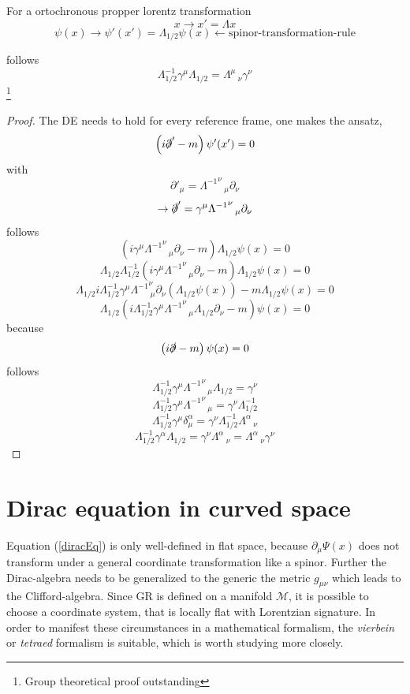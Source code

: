 \documentclass[12pt,a4paper]{article}
\begin{document}
	For a ortochronous propper lorentz transformation
	$$ 
	x \rightarrow x' = \Lambda x
	$$
	$$\psi(x) \rightarrow \psi'(x') = \Lambda_{1/2} \psi(x) \leftarrow \text{spinor-transformation-rule}$$
	
	follows
	$$
	\Lambda_{1/2}^{-1} \gamma^\mu \Lambda_{1/2} = \Lambda^\mu\,_{ \nu} \gamma^\nu 
	$$
	\footnote{Group theoretical proof outstanding}
	
	\begin{proof}
		The DE needs to hold for every reference frame, one makes the ansatz,
		$$\left( i \slashed{\partial}' -m \right) \psi '(x') = 0$$ 
		with
		$$\partial'_\mu = {\Lambda^{-1}}^{\nu}\,_{\mu}  \partial_\nu $$
		$$\rightarrow \slashed{\partial}' = \gamma^\mu {\Lambda^{-1}}^{\nu}\,_{\mu}  \partial_\nu$$
		follows
		$$\left( i \gamma^\mu {\Lambda^{-1}}^{\nu}\,_{\mu}  \partial_\nu -m \right) \Lambda_{1/2} \psi(x) = 0$$ 
		$$ \Lambda_{1/2}  \Lambda_{1/2}^{-1}\left( i \gamma^\mu {\Lambda^{-1}}^{\nu}\,_{\mu}  \partial_\nu -m \right) \Lambda_{1/2} \psi(x) = 0$$ 
		$$ \Lambda_{1/2}  i \Lambda_{1/2}^{-1} \gamma^\mu {\Lambda^{-1}}_{\ \mu}^{\nu}  \partial_\nu \left(\Lambda_{1/2} \psi(x)\right) -m   \Lambda_{1/2} \psi(x)= 0$$ 
		$$ \Lambda_{1/2} \left( i \Lambda_{1/2}^{-1} \gamma^\mu {\Lambda^{-1}}^{\nu}\,_{\mu}  \Lambda_{1/2} \partial_\nu -m \right) \psi(x) = 0$$ 
		because
		$$\left( i \slashed{\partial} -m \right) \psi(x) = 0$$
		follows
		$$\Lambda_{1/2}^{-1} \gamma^\mu {\Lambda^{-1}}^{\nu}\,_{\mu}  \Lambda_{1/2} = \gamma^\nu$$
		$$\Lambda_{1/2}^{-1} \gamma^\mu {\Lambda^{-1}}^{\nu}\,_{\mu}   = \gamma^\nu \Lambda_{1/2}^{-1}$$
		$$\Lambda_{1/2}^{-1} \gamma^\mu \delta^\alpha_\mu   = \gamma^\nu \Lambda_{1/2}^{-1}\Lambda^\alpha\,_{\nu}$$
		$$\Lambda_{1/2}^{-1} \gamma^\alpha \Lambda_{1/2} = \gamma^\nu \Lambda^\alpha\,_{\nu}=  \Lambda^\alpha\,_{\nu} \gamma^\nu $$
	\end{proof}
	
	\section{Dirac equation in curved space}
	Equation (\ref{diracEq}) is only well-defined in flat space, because $\partial_\mu \Psi(x)$ does not transform under a general coordinate transformation like a spinor. Further the Dirac-algebra needs to be generalized to the generic the metric $g_{\mu \nu}$ which leads to the Clifford-algebra. Since GR is defined on a manifold $\mathcal{M}$, it is possible to choose a coordinate system, that is locally flat with Lorentzian signature. In order to manifest these circumstances in a mathematical formalism, the \textit{vierbein} or \textit{tetraed} formalism is suitable, which is worth studying more closely.
	
\end{document}
